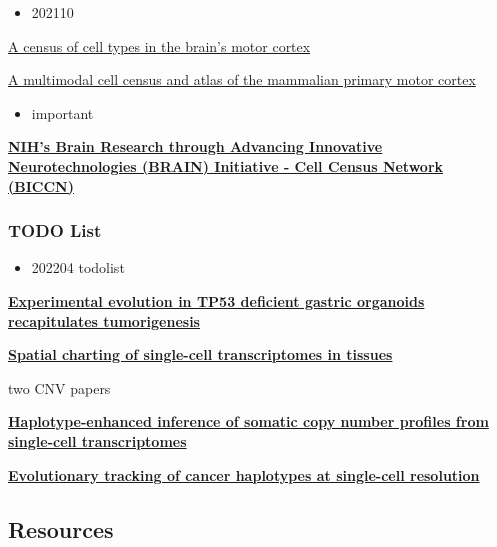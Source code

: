 \documentclass[
]{book}
\providecommand{\tightlist}{%
  \setlength{\itemsep}{0pt}\setlength{\parskip}{0pt}}
\begin{document}
\begin{itemize}
\tightlist
\item
  202110
\end{itemize}

\href{https://www.nature.com/articles/d41586-021-02493-8}{A census of cell types in the brain's motor cortex}

\href{https://www.nature.com/articles/s41586-021-03950-0}{A multimodal cell census and atlas of the mammalian primary motor cortex}

\begin{itemize}
\tightlist
\item
  important
\end{itemize}

\textbf{\href{https://biccn.org/}{NIH's Brain Research through Advancing Innovative Neurotechnologies (BRAIN) Initiative - Cell Census Network (BICCN)}}

\hypertarget{todo-list}{%
\subsubsection{TODO List}\label{todo-list}}

\begin{itemize}
\tightlist
\item
  202204 todolist
\end{itemize}

\textbf{\href{https://www.biorxiv.org/content/10.1101/2022.04.09.487529v1}{Experimental evolution in TP53 deficient gastric organoids recapitulates tumorigenesis}\citep{karlsson2022experimental}}

\textbf{\href{https://www.nature.com/articles/s41587-022-01233-1}{Spatial charting of single-cell transcriptomes in tissues}\citep{wei2022spatial}}

two CNV papers

\textbf{\href{https://www.biorxiv.org/content/10.1101/2022.02.07.479314v1}{Haplotype-enhanced inference of somatic copy number profiles from single-cell transcriptomes}\citep{gao2022haplotype}}

\textbf{\href{https://www.biorxiv.org/content/10.1101/2021.06.04.447031v1}{Evolutionary tracking of cancer haplotypes at single-cell resolution}\citep{williams2021evolutionary}}

\hypertarget{resources}{%
\subsection{Resources}\label{resources}}
\end{document}
